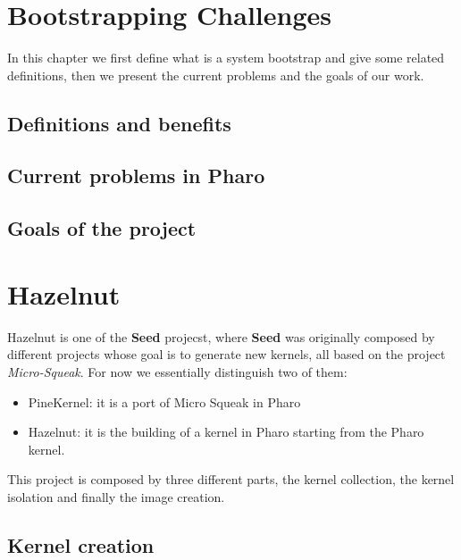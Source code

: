\documentclass{book}
\begin{document}

\chapter{Bootstrapping Challenges}

In this chapter we first define what is a system bootstrap and give some related definitions, then we present the current problems and the goals of our work.

	\section{Definitions and benefits}
	\section{Current problems in Pharo}\label{BootStrap}
	\section{Goals of the project}


\chapter{Hazelnut}

Hazelnut is one of the \textbf{Seed} projecst, where \textbf{Seed} was originally composed by different projects whose goal is to generate new kernels, all based on the project \emph{Micro-Squeak}.
For now we essentially distinguish two of them:
\begin{itemize}
	\item PineKernel: it is a port of \gls{Micro Squeak} in Pharo
	\item Hazelnut: it is the building of a kernel in Pharo starting from the Pharo kernel.
\end{itemize}

This project is composed by three different parts, the kernel collection, the kernel isolation and finally the image creation.

	\section{Kernel creation}
\end{document}
